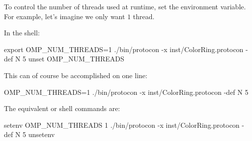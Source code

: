 To control the number of threads used at runtime, set the  environment variable.
For example, let's imagine we only want $1$ thread.

In the  shell:
\begin{code}
export OMP_NUM_THREADS=1
./bin/protocon -x inst/ColorRing.protocon -def N 5
unset OMP_NUM_THREADS
\end{code}
This can of course be accomplished on one line:
\begin{code}
OMP_NUM_THREADS=1 ./bin/protocon -x inst/ColorRing.protocon -def N 5
\end{code}

The equivalent  or  shell commands are:
\begin{code}
setenv OMP_NUM_THREADS 1
./bin/protocon -x inst/ColorRing.protocon -def N 5
unsetenv
\end{code}



